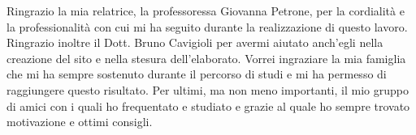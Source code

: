 \documentclass[12pt, cucitura]{toptesi}
\makeatletter
\newcommand\listofcodes{%
 \iffrontmatter\else\frontmattertrue\fi
 \if@openright\cleardoublepage\else\clearpage\fi
 \begingroup\def\chapter##1{\@schapter}
 \phantomsection %
 \lstlistoflistings 
 \endgroup
}
\makeatother
\begin{document}
\frontespizio




\ringraziamenti
Ringrazio la mia relatrice, la professoressa Giovanna Petrone, per la
cordialità e la professionalità con cui mi ha seguito durante la
realizzazione di questo lavoro. Ringrazio inoltre il Dott. Bruno Cavigioli per
avermi aiutato anch’egli nella creazione del sito e nella stesura dell’elaborato.
Vorrei ingraziare la mia famiglia che mi ha sempre sostenuto durante il percorso di studi e mi ha permesso di raggiungere questo risultato. Per ultimi, ma non meno importanti, il mio gruppo di amici con i quali ho frequentato e studiato e grazie al quale ho sempre trovato motivazione e ottimi consigli.



\tableofcontents





\mainmatter








{}
\nocite{*}
\printbibliography
\end{document}
